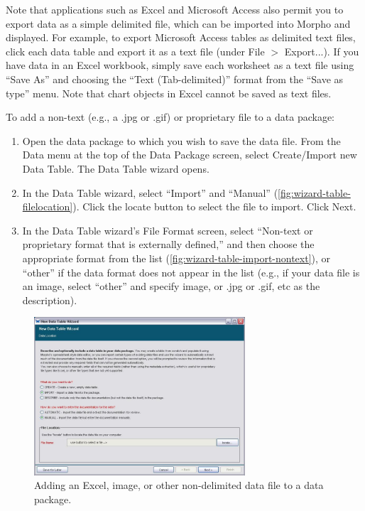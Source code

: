 Note that applications such as Excel and Microsoft Access also permit
you to export data as a simple delimited file, which can be imported
into Morpho and displayed. For example, to export Microsoft Access
tables as delimited text files, click each data table and export it as a
text file (under File $>$ Export...). If you have data in an Excel
workbook, simply save each worksheet as a text file using ``Save As''
and choosing the ``Text (Tab-delimited)'' format from the ``Save as
type'' menu. Note that chart objects in Excel cannot be saved as text
files. 

To add a non-text (e.g., a .jpg or .gif) or proprietary file to a data
package:
\begin{enumerate}
  \item Open the data package to which you wish to save the data file.
    From the Data menu at the top of the Data Package screen, select
    Create/Import new Data Table. The Data Table wizard opens.
  \item In the Data Table wizard, select ``Import'' and ``Manual''
    (\autoref{fig:wizard-table-filelocation}). Click the locate button
    to select the file to import. Click Next.
  \item In the Data Table wizard's File Format screen, select ``Non-text
    or proprietary format that is externally defined,'' and then choose
    the appropriate format from the list
    (\autoref{fig:wizard-table-import-nontext}), or ``other'' if the
    data format does not appear in the list (e.g., if your data file is
    an image, select ``other'' and specify image, or .jpg or .gif, etc
    as the description).
\end{enumerate}

\begin{figure}
  \centering
    \includegraphics[width=0.7\textwidth]{images/wizard-table-filelocation.jpg}
  \caption{Adding an Excel, image, or other non-delimited data file to a
    data package.}
  \label{fig:wizard-table-filelocation}
\end{figure}


